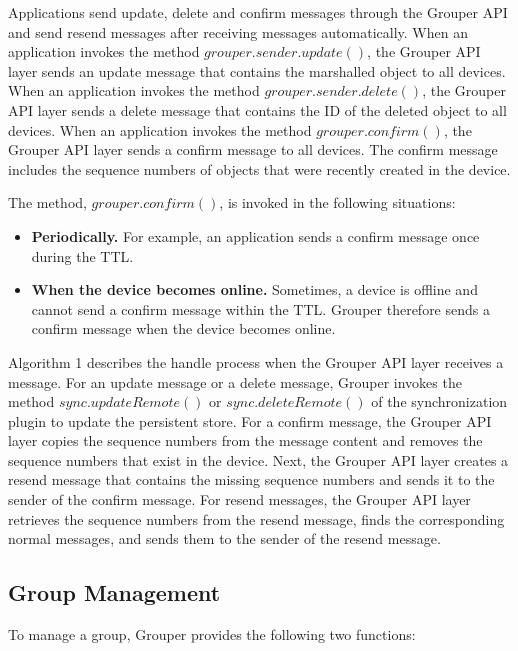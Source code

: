 \documentclass[sigconf]{acmart}
\begin{document}
Applications send update, delete and confirm messages through the Grouper API and send resend messages after receiving messages automatically.
When an application invokes the method $grouper.sender.update()$, the Grouper API layer sends an update message that contains the marshalled object to all devices.
When an application invokes the method $grouper.sender.delete()$, the Grouper API layer sends a delete message that contains the ID of the deleted object to all devices. 
When an application invokes the method $grouper.confirm()$, the Grouper API layer sends a confirm message to all devices. 
The confirm message includes the sequence numbers of objects that were recently created in the device.

The method, $grouper.confirm()$, is invoked in the following situations:

\begin{itemize}
	\setlength{\itemsep}{1pt}
	\setlength{\parskip}{0pt}
	\setlength{\parsep}{0pt}
	\item \textbf{Periodically.}
	For example, an application sends a confirm message once during the TTL.
	\item \textbf{When the device becomes online.} 
	Sometimes, a device is offline and cannot send a confirm message within the TTL.
	Grouper therefore sends a confirm message when the device becomes online.
\end{itemize}

Algorithm 1 describes the handle process when the Grouper API layer receives a message.
For an update message or a delete message, Grouper invokes the method $sync.updateRemote()$ or $sync.deleteRemote()$ of the synchronization plugin to update the persistent store.
For a confirm message, the Grouper API layer copies the sequence numbers from the message content and removes the sequence numbers that exist in the device.
Next, the Grouper API layer creates a resend message that contains the missing sequence numbers and sends it to the sender of the confirm message.
For resend messages, the Grouper API layer retrieves the sequence numbers from the resend message, finds the corresponding normal messages, and sends them to the sender of the resend message.

\subsection{Group Management}

To manage a group, Grouper provides the following two functions:
\end{document}
